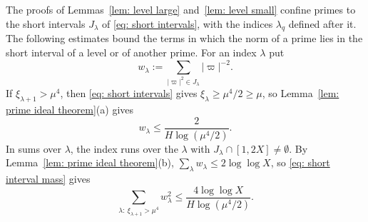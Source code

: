 \documentclass{article}
\numberwithin{equation}{section}
\newcommand{\Le}{\leqslant}
\newcommand{\Ge}{\geqslant}
\begin{document}
The proofs of Lemmas~\ref{lem: level large} and~\ref{lem: level small} confine primes to the short intervals $J_\lambda$ of \eqref{eq: short intervals}, with the indices $\lambda_q$ defined after it. The following estimates bound the terms in which the norm of a prime lies in the short interval of a level or of another prime. For an index $\lambda$ put
\begin{equation}
\label{eq: short interval sum}
w_\lambda := \sum_{|\varpi|^2 \in J_\lambda} |\varpi|^{-2}.
\end{equation}
If $\xi_{\lambda + 1} > \mu^4$, then \eqref{eq: short intervals} gives $\xi_\lambda \Ge \mu^4/2 \Ge \mu$, so Lemma~\ref{lem: prime ideal theorem}(a) gives
\begin{equation}
\label{eq: short interval mass}
w_\lambda \Le \frac{2}{H \log(\mu^4/2)}.
\end{equation}
In sums over $\lambda$, the index runs over the $\lambda$ with $J_\lambda \cap [1, 2X] \neq \emptyset$. By Lemma~\ref{lem: prime ideal theorem}(b), $\sum_\lambda w_\lambda \Le 2\log\log X$, so \eqref{eq: short interval mass} gives
\begin{equation}
\label{eq: short interval square}
\sum_{\lambda:\ \xi_{\lambda + 1} > \mu^4} w_\lambda^2 \Le \frac{4 \log\log X}{H \log(\mu^4/2)}.
\end{equation}
\end{document}
